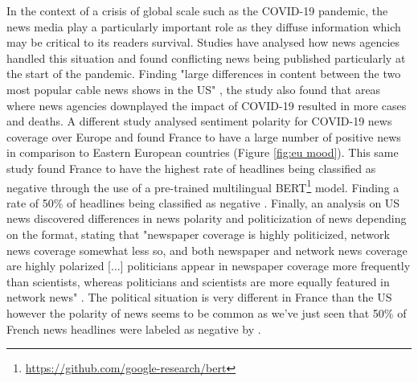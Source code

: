 In the context of a crisis of global scale such as the COVID-19 pandemic, the news media play a particularly important role as they diffuse information which may be critical to its readers survival. Studies have analysed how news agencies handled this situation and found conflicting news being published particularly at the start of the pandemic. Finding "large diﬀerences in content between the two most popular cable news shows in the US" \citep{bursztyn2020misinformation}, the study also found that areas where news agencies downplayed the impact of COVID-19 resulted in more cases and deaths. A different study analysed sentiment polarity for COVID-19 news coverage over Europe and found France to have a large number of positive news in comparison to Eastern European countries (Figure \ref{fig:eu mood}). This same study found France to have the highest rate of headlines being classified as negative through the use of a pre-trained multilingual BERT\footnote{\url{https://github.com/google-research/bert}} model. Finding a rate of 50\% of headlines being classified as negative \citep{robertson2021covid}.
Finally, an analysis on US  news discovered differences in news polarity and politicization of news depending on the format, stating that "newspaper coverage is highly politicized, network news coverage somewhat less so, and both newspaper and network news coverage are highly polarized [...] politicians appear in newspaper coverage more frequently than scientists, whereas politicians and scientists are more equally featured in network news" \citep{hart2020covid19}. The political situation is very different in France than the US however the polarity of news seems to be common as we've just seen that 50\% of French news headlines were labeled as negative by \cite{robertson2021covid}.

